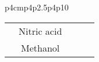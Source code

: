 \begin{landscape}
\begin{small}
\begin{longtable}{p{4cm}p{}p{}p{}p10}
\begin{tabular}{c|c|c|c|c}
                                                                                                 & Nitric acid                                                                                           &                                                                                                      &                                                                                              &                                                                                                                                                                                                                                                                                                                                                                                                                                                                                                                                                                                                                                                                                                                                                                                                                                                                                                                           \\
                                                                                                 & Methanol                                                                                              &                                                                                                      &                                                                                              &                                                                                                                                                                                                                                                                                                                                                                                                                                                                                                                                                                                                                                                                                                                                                                                                                                                                                                                           \\

\end{tabular}
\end{longtable}
\end{small}
\end{landscape}
